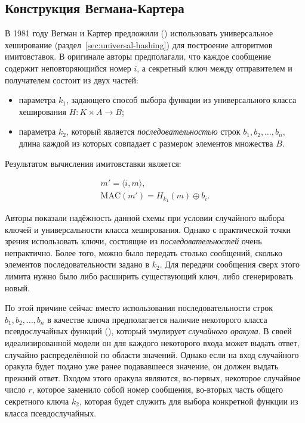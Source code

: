 \subsection{Конструкция Вегмана-Картера}

В 1981 году Вегман и Картер предложили (\cite{Wegman:Carter:1981}) использовать универсальное хеширование (раздел~\ref{sec:universal-hashing}) для построение алгоритмов имитовставок. В оригинале авторы предполагали, что каждое сообщение содержит неповторяющийся номер $i$, а секретный ключ между отправителем и получателем состоит из двух частей:

\begin{itemize}
    \item параметра $k_1$, задающего способ выбора функции из универсального класса хеширования $H: K \times A \to B$;
    \item параметра $k_2$, который является \emph{последовательностью} строк $b_1, b_2, \dots, b_n$, длина каждой из которых совпадает с размером элементов множества $B$.
\end{itemize}

Результатом вычисления имитовставки является:

\[ \begin{array}{l}
    m' = \langle i, m \rangle,\\
    \textrm{MAC} (m') = H_{k_1}(m) \oplus b_i.
\end{array} \]

Авторы показали надёжность данной схемы при условии случайного выбора ключей и универсальности класса хеширования. Однако с практической точки зрения использовать ключи, состоящие из \emph{последовательностей} очень непрактично. Более того, можно было передать столько сообщений, сколько элементов последовательности задано в $k_2$. Для передачи сообщения сверх этого лимита нужно было либо расширить существующий ключ, либо сгенерировать новый.

По этой причине сейчас вместо использования последовательности строк $b_1, b_2, \dots, b_n$ в качестве ключа предполагается наличие некоторого класса псевдослучайных функций (), который эмулирует \emph{случайного оракула}. В своей идеализированной модели он для каждого некоторого входа может выдать ответ, случайно распределённой по области значений. Однако если на вход случайного оракула будет подано уже ранее подававшееся значение, он должен выдать прежний ответ. Входом этого оракула являются, во-первых, некоторое случайное число $r$, которое заменило собой номер сообщения, во-вторых часть общего секретного ключа $k_2$, которая будет служить для выбора конкретной функции из класса псевдослучайных.


